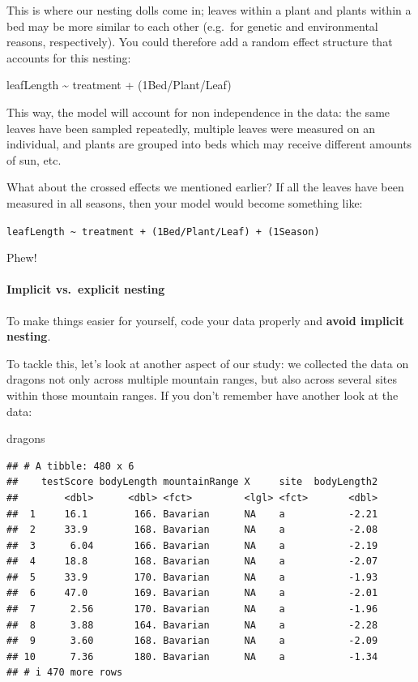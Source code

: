 \documentclass[
]{article}
\newenvironment{Shaded}{\begin{snugshade}}{\end{snugshade}}
\newcommand{\NormalTok}[1]{#1}
\begin{document}
This is where our nesting dolls come in; leaves within a plant and
plants within a bed may be more similar to each other (e.g.~for genetic
and environmental reasons, respectively). You could therefore add a
random effect structure that accounts for this nesting:

leafLength \textasciitilde{} treatment + (1\textbar Bed/Plant/Leaf)

This way, the model will account for non independence in the data: the
same leaves have been sampled repeatedly, multiple leaves were measured
on an individual, and plants are grouped into beds which may receive
different amounts of sun, etc.

What about the crossed effects we mentioned earlier? If all the leaves
have been measured in all seasons, then your model would become
something like:

\texttt{leafLength\ \textasciitilde{}\ treatment\ +\ (1\textbar{}Bed/Plant/Leaf)\ +\ (1\textbar{}Season)}

Phew!

\paragraph{Implicit vs.~explicit
nesting}\label{implicit-vs.-explicit-nesting}

To make things easier for yourself, code your data properly and
\textbf{avoid implicit nesting}.

To tackle this, let's look at another aspect of our study: we collected
the data on dragons not only across multiple mountain ranges, but also
across several sites within those mountain ranges. If you don't remember
have another look at the data:

\begin{Shaded}
\begin{Highlighting}[]
\NormalTok{dragons}
\end{Highlighting}
\end{Shaded}

\begin{verbatim}
## # A tibble: 480 x 6
##    testScore bodyLength mountainRange X     site  bodyLength2
##        <dbl>      <dbl> <fct>         <lgl> <fct>       <dbl>
##  1     16.1        166. Bavarian      NA    a           -2.21
##  2     33.9        168. Bavarian      NA    a           -2.08
##  3      6.04       166. Bavarian      NA    a           -2.19
##  4     18.8        168. Bavarian      NA    a           -2.07
##  5     33.9        170. Bavarian      NA    a           -1.93
##  6     47.0        169. Bavarian      NA    a           -2.01
##  7      2.56       170. Bavarian      NA    a           -1.96
##  8      3.88       164. Bavarian      NA    a           -2.28
##  9      3.60       168. Bavarian      NA    a           -2.09
## 10      7.36       180. Bavarian      NA    a           -1.34
## # i 470 more rows
\end{verbatim}
\end{document}

